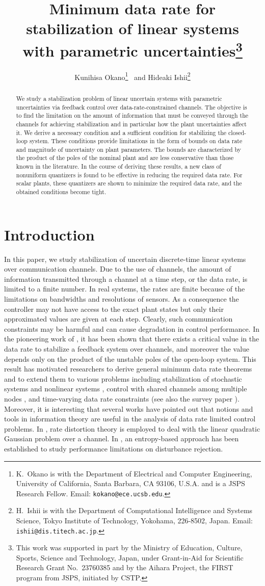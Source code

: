 \documentclass[a4paper, 11pt]{article}
\title{Minimum data rate for stabilization of linear systems\\
 with parametric uncertainties\thanks{This work was supported in part by the Ministry of Education, Culture, Sports,
Science and Technology, Japan, under Grant-in-Aid for Scientific Research Grant
No.~23760385 and by the Aihara Project, the FIRST program from JSPS,
initiated by CSTP.
}}
\author{Kunihisa Okano\thanks{K.~Okano is with the Department of Electrical and Computer Engineering,
University of California,
Santa Barbara, CA 93106, U.S.A. and is a JSPS Research Fellow.
Email: {\tt \small kokano@ece.ucsb.edu}.}
~and Hideaki Ishii\thanks{H.~Ishii is with the Department of Computational Intelligence and Systems Science,
Tokyo Institute of Technology,
Yokohama, 226-8502, Japan.
Email: {\tt \small ishii@dis.titech.ac.jp}.
}}
\theoremstyle{definition}
\begin{document}
\maketitle

\begin{abstract}
We study a stabilization problem of linear uncertain systems with parametric
uncertainties via feedback control over data-rate-constrained channels.
The objective is to find the limitation on the amount of information that
must be conveyed through the channels for achieving stabilization and
in particular how the plant uncertainties affect it.
We derive a necessary condition and a sufficient condition for stabilizing
the closed-loop system.
These conditions provide limitations in the form of bounds on
data rate and magnitude of uncertainty on plant parameters.
The bounds are characterized by the product of the poles of the nominal
plant and are less conservative than those known in the literature.
In the course of deriving these results, a new class of nonuniform quantizers
is found to be effective in reducing the required data rate.
For scalar plants, these quantizers are shown to minimize the required data rate,
and the obtained conditions become tight.
\end{abstract}


\section{Introduction}\label{sec,intro}
In this paper, we study stabilization of uncertain discrete-time linear systems
over communication channels.
Due to the use of channels, the amount of information transmitted through
a channel at a time step, or the data rate, is limited to a finite number.
In real systems, the rates are finite because of the limitations on bandwidths
and resolutions of sensors.
As a consequence the controller may not have access to the exact plant
states but only their approximated values are given at each step.
Clearly, such communication constraints may be harmful and can cause degradation
in control performance.
In the pioneering work of \cite{Wong1999}, it has been shown that there
exists a critical value in the data rate to stabilize a feedback system
over channels, and moreover the value depends only on the product of the
unstable poles of the open-loop system.
This result has motivated researchers to derive general minimum data rate
theorems \cite{Tatikonda2004} and to extend them to various problems including
stabilization of stochastic systems \cite{Nair2004} and nonlinear systems \cite{Liberzon2005},
control with shared channels among multiple nodes \cite{Nesic2009},
and time-varying data rate constraints \cite{Minero2009}
(see also the survey paper \cite{Nair2007}).
Moreover, it is interesting that several works have pointed out that notions and tools
in information theory are useful in the analysis of data rate limited control problems.
In \cite{Tatikonda2004b}, rate distortion theory is employed to deal with the
linear quadratic Gaussian problem over a channel.
In \cite{Shingin2012}, an entropy-based approach has been established to
study performance limitations on disturbance rejection.
\end{document}
